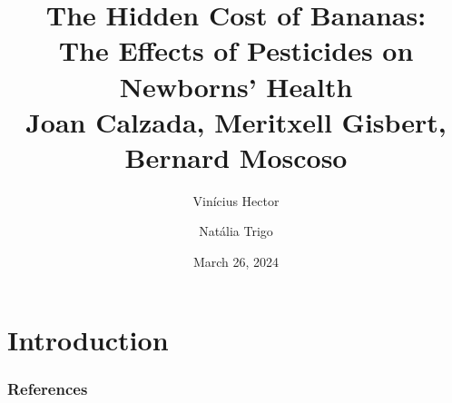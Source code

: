 \documentclass[hyperref={pdfpagelabels=false}]{beamer}
\title[The Hidden Cost of Bananas] { The Hidden Cost of Bananas:  \\ The Effects of Pesticides on Newborns’ Health  \\  \vspace{5mm} \large \textcolor{greenfriendly}{Joan Calzada, Meritxell Gisbert, Bernard Moscoso} }
\author[Vinícius Hector and Natália Trigo]{Vinícius Hector \and Natália Trigo}
\date{March 26, 2024}
\institute[]{ \textcolor{greenfriendly}{JAERE (2023) }\\ \vspace{2mm} Environmental and Urban Economics \\ Professor: Sophie Mattes}
\begin{document}
	
	\begin{frame}
		\titlepage
	\end{frame} 
	
	
	\begin{frame}
		\frametitle{}
		\tableofcontents
	\end{frame} 
	
	
	\section{Introduction} 
	\begin{frame}

\end{frame}
	

	\begin{frame}
		\frametitle{References}
		
	\end{frame}
	
	
\end{document}
